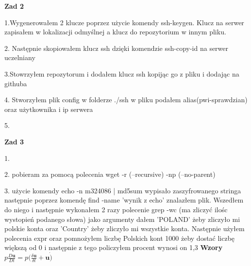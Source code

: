 \documentclass[10pt,a4paper]{article}
\begin{document}
	
	\textbf{Zad 2}
	
	1.Wygenerowałem 2 klucze poprzez użycie komendy ssh-keygen. Klucz na serwer zapisałem w lokalizacji odmyślnej a klucz do repozytorium w innym pliku.
	
	2. Następnie skopiowałem klucz ssh dzięki komendzie ssh-copy-id na serwer uczelniany
	
	3.Stowrzyłem repozytorum i dodałem klucz ssh kopijąc go z pliku i dodając na githuba
	
	4. Stworzyłem plik config w folderze ./ssh w pliku podałem alias(pwi-sprawdzian) oraz użytkownika i ip serwera
	
	5.
	
	\textbf{Zad 3}
	
	1.
	
	2. pobieram za pomocą polecenia wget -r (--recursive) -np (--no-parent) 
	
	3. użycie komendy echo -n m324086 | md5sum wypisało zaszyfrowanego stringa następnie poprzez komendę find -name 'wynik z echo' znalazłem plik. Wszedłem do niego i następnie wykonałem 2 razy polecenie grep -wc (ma zliczyć ilośc wystopień podanego słowa) jako argumenty dałem 'POLAND' żeby zliczyło mi polskie konta oraz 'Country' żeby zliczyło mi wszystkie konta. Następnie użyłem polecenia expr oraz pomnożyłem liczbę Polskich kont 1000 żeby dostać liczbę większą od 0 i następnie z tego policzyłem procent wynosi on 1,3%
	\textbf{Wzory}
	 $ p\frac{D\textbf{u}}{Dt} = p(\frac{\delta\textbf{u}}{\delta t}+\textbf{u}\dot)$
		
\end{document}
